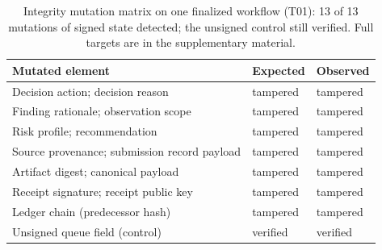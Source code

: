 \begin{table}[!htbp]
\caption{Integrity mutation matrix on one finalized workflow (T01): 13
of 13 mutations of signed state detected; the unsigned control still
verified. Full targets are in the supplementary material.}
\label{tab:trust}
\centering
\small
\setlength{\tabcolsep}{4pt}
\begin{tabular}{@{}L{7.4cm}ll@{}}
\toprule
Mutated element & Expected & Observed \\
\midrule
Decision action; decision reason & tampered & tampered \\
Finding rationale; observation scope & tampered & tampered \\
Risk profile; recommendation & tampered & tampered \\
Source provenance; submission record payload & tampered & tampered \\
Artifact digest; canonical payload & tampered & tampered \\
Receipt signature; receipt public key & tampered & tampered \\
Ledger chain (predecessor hash) & tampered & tampered \\
Unsigned queue field (control) & verified & verified \\
\bottomrule
\end{tabular}
\end{table}
